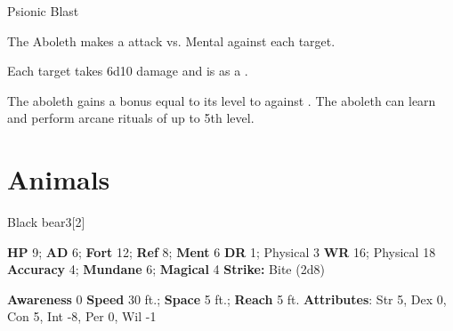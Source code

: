     \begin{freeability}{Psionic Blast}
      
    
      The Aboleth makes a  attack
        vs. Mental against each target.
    
    \hit Each target takes 6d10  damage and is  as a .
    
  
    \end{freeability}
  
         The aboleth gains a bonus equal to its level to  against .
     The aboleth can learn and perform arcane rituals of up to 5th level.
  
        \section{Animals}
      
  \begin{monsection}{Black bear}{3}[2]
    \vspace{-1em}\vspace{-1em}
    \begin{spellcontent}
      \begin{spelltargetinginfo}
        \pari \textbf{HP} 9;
          \textbf{AD} 6;
          \textbf{Fort} 12;
          \textbf{Ref} 8;
          \textbf{Ment} 6
        \pari \textbf{DR} 1; Physical 3
        \pari \textbf{WR} 16; Physical 18
        \pari \textbf{Accuracy} 4;
          \textbf{Mundane} 6;
          \textbf{Magical} 4
        \pari \textbf{Strike:}
            Bite  (2d8)
      \end{spelltargetinginfo}
    \end{spellcontent}
    \begin{monsterfooter}
      \pari \textbf{Awareness} 0
      \pari \textbf{Speed} 30 ft.;
        \textbf{Space} 5 ft.;
        \textbf{Reach} 5 ft.
      \pari \textbf{Attributes}:
        Str 5, Dex 0, Con 5,
        Int -8, Per 0, Wil -1
    \end{monsterfooter}
  \end{monsection}
  
